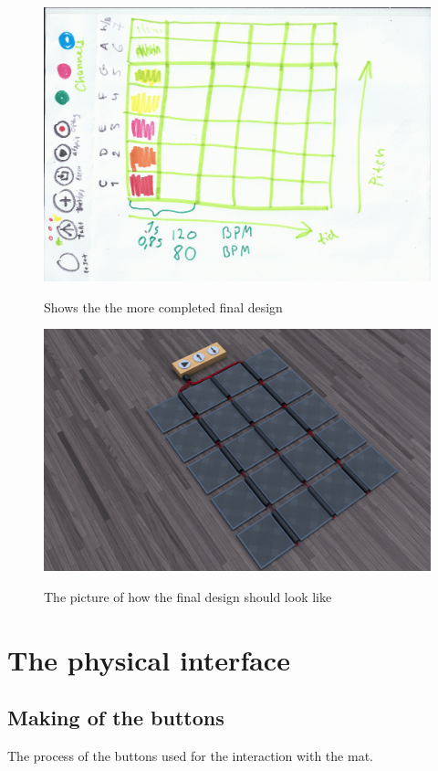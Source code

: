 \begin{figure}[H]
	\centering
	\includegraphics[width=0.7\linewidth]{figure/Design/sketchTwo}
	\label{fig:sketchTwo}
	\caption{Shows the the more completed final design}
	
\end{figure}

\begin{figure}[H]
	\centering
	\includegraphics[width=0.7\linewidth]{figure/Design/finaldesign}
	\label{fig:finaldesign}
	\caption{The picture of how the final design should look like}
	
\end{figure}


\section{The physical interface}

\subsection{Making of the buttons}

The process of the buttons used for the interaction with the mat.

